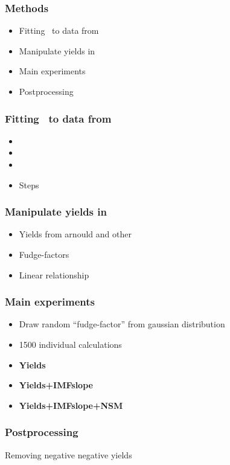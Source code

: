 
\begin{frame}
\frametitle{Methods}
\begin{itemize}
\item Fitting \omegamodel\ to data from \eris
\item Manipulate yields in \omegamodel
\item Main experiments 
\item Postprocessing
\end{itemize}
\end{frame}

\begin{frame}
\frametitle{Fitting \omegamodel\ to data from \eris}
\begin{itemize}
\item {}
\item {}
\item {}
\item Steps
\end{itemize}
\end{frame}


\begin{frame}
\frametitle{Manipulate yields in \omegamodel}
\begin{itemize}
\item Yields from arnould and other \todo
\item Fudge-factors \todo
\item Linear relationship
\end{itemize}
\end{frame}

\begin{frame}
\frametitle{Main experiments }
\begin{itemize}
\item Draw random ``fudge-factor'' from gaussian distribution
\item 1500 individual calculations
\item \textbf{Yields}
\item \textbf{Yields+IMFslope}
\item \textbf{Yields+IMFslope+NSM}
\end{itemize}
\end{frame}

\begin{frame}
\frametitle{Postprocessing}
\begin{minipage}{0.45\linewidth}
\betadecay
\vfill
\end{minipage}
\hfill
\begin{minipage}{0.45\linewidth}
Removing negative negative yields
\vfill
\end{minipage}
\end{frame}
